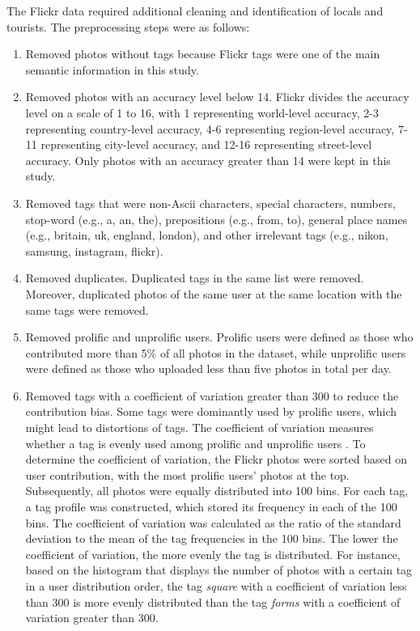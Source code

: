 \documentclass{article}
\theoremstyle{remark}
\begin{document}
The Flickr data required additional cleaning and identification of locals and tourists. The preprocessing steps were as follows:
\begin{enumerate}
    \item Removed photos without tags because Flickr tags were one of the main semantic information in this study.
    \item Removed photos with an accuracy level below 14. Flickr divides the accuracy level on a scale of 1 to 16, with 1 representing world-level accuracy, 2-3 representing country-level accuracy, 4-6 representing region-level accuracy, 7-11 representing city-level accuracy, and 12-16 representing street-level accuracy. Only photos with an accuracy greater than 14 were kept in this study.
    \item Removed tags that were non-Ascii characters, special characters, numbers, stop-word (e.g., a, an, the), prepositions (e.g., from, to), general place names (e.g., britain, uk, england, london), and other irrelevant tags (e.g., nikon, samsung, instagram, flickr).
    \item Removed duplicates. Duplicated tags in the same list were removed. Moreover, duplicated photos of the same user at the same location with the same tags were removed.
    \item Removed prolific and unprolific users. Prolific users were defined as those who contributed more than 5\% of all photos in the dataset, while unprolific users were defined as those who uploaded less than five photos in total per day.
    \item Removed tags with a coefficient of variation greater than 300 to reduce the contribution bias. Some tags were dominantly used by prolific users, which might lead to distortions of tags. The coefficient of variation measures whether a tag is evenly used among prolific and unprolific users \cite{hollenstein_exploring_2010}. To determine the coefficient of variation, the Flickr photos were sorted based on user contribution, with the most prolific users' photos at the top. Subsequently, all photos were equally distributed into 100 bins. For each tag, a tag profile was constructed, which stored its frequency in each of the 100 bins. The coefficient of variation was calculated as the ratio of the standard deviation to the mean of the tag frequencies in the 100 bins. The lower the coefficient of variation, the more evenly the tag is distributed. For instance, based on the histogram that displays the number of photos with a certain tag in a user distribution order, the tag \textit{square} with a coefficient of variation less than 300 is more evenly distributed than the tag \textit{forms} with a coefficient of variation greater than 300.

\end{enumerate}
\end{document}
